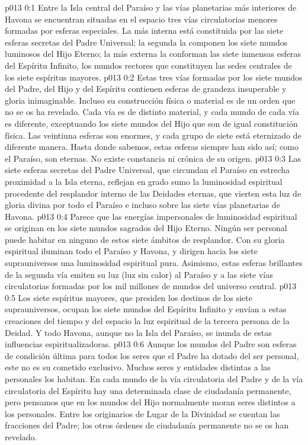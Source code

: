 \author{Perfeccionador de la sabiduría}
\vs p013 0:1 Entre la Isla central del Paraíso y las vías planetarias más interiores de Havona se encuentran situadas en el espacio tres vías circulatorias menores formadas por esferas especiales. La más interna está constituida por las siete esferas secretas del Padre Universal; la segunda la componen los siete mundos luminosos del Hijo Eterno; la más externa la conforman las siete inmensas esferas del Espíritu Infinito, los mundos rectores que constituyen las sedes centrales de los siete espíritus mayores.
\vs p013 0:2 Estas tres vías formadas por los siete mundos del Padre, del Hijo y del Espíritu contienen esferas de grandeza insuperable y gloria inimaginable. Incluso su construcción física o material es de un orden que no se os ha revelado. Cada vía es de distinto material, y cada mundo de cada vía es diferente, exceptuando los siete mundos del Hijo que son de igual constitución física. Las veintiuna esferas son enormes, y cada grupo de siete está eternizado de diferente manera. Hasta donde sabemos, estas esferas siempre han sido así; como el Paraíso, son eternas. No existe constancia ni crónica de su origen.
\vs p013 0:3 \pc Las siete esferas secretas del Padre Universal, que circundan el Paraíso en estrecha proximidad a la Isla eterna, reflejan en grado sumo la luminosidad espiritual procedente del resplandor interno de las Deidades eternas, que vierten esta luz de gloria divina por todo el Paraíso e incluso sobre las siete vías planetarias de Havona.
\vs p013 0:4 \pc Parece que las energías impersonales de luminosidad espiritual se originan en los siete mundos sagrados del Hijo Eterno. Ningún ser personal puede habitar en ninguno de estos siete ámbitos de resplandor. Con su gloria espiritual iluminan todo el Paraíso y Havona, y dirigen hacia los siete suprauniversos una luminosidad espiritual pura. Asimismo, estas esferas brillantes de la segunda vía emiten su luz (luz sin calor) al Paraíso y a las siete vías circulatorias formadas por los mil millones de mundos del universo central.
\vs p013 0:5 \pc Los siete espíritus mayores, que presiden los destinos de los siete suprauniversos, ocupan los siete mundos del Espíritu Infinito y envían a estas creaciones del tiempo y del espacio la luz espiritual de la tercera persona de la Deidad. Y todo Havona, aunque no la Isla del Paraíso, se inunda de estas influencias espiritualizadoras.
\vs p013 0:6 \pc Aunque los mundos del Padre son esferas de condición última para todos los seres que el Padre ha dotado del ser personal, este no es su cometido exclusivo. Muchos seres y entidades distintas a las personales los habitan. En cada mundo de la vía circulatoria del Padre y de la vía circulatoria del Espíritu hay una determinada clase de ciudadanía permanente, pero pensamos que en los mundos del Hijo normalmente moran seres distintos a los personales. Entre los originarios de Lugar de la Divinidad se cuentan las fracciones del Padre; los otros órdenes de ciudadanía permanente no se os han revelado.

